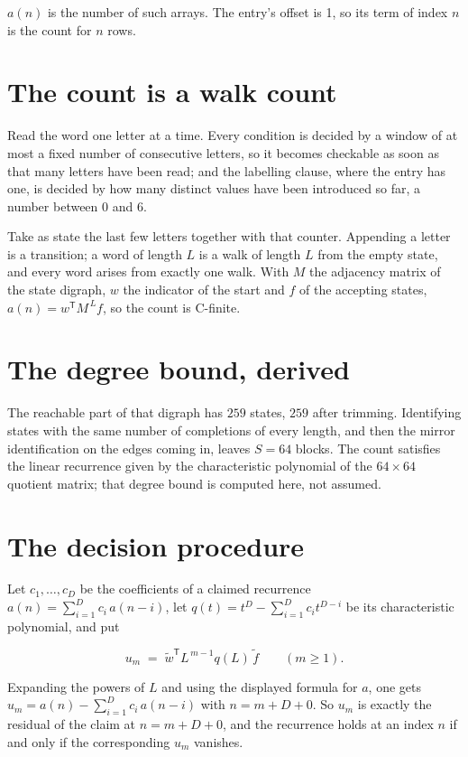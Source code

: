 \documentclass[11pt]{article}
\theoremstyle{definition}
\begin{document}
$a(n)$ is the number of such arrays. The entry's offset is 1, so its term of index $n$ is the count for $n$ rows.

\section{The count is a walk count}

Read the word one letter at a time. Every condition is decided by a window of at most a fixed number of consecutive letters, so it becomes checkable as soon as that many letters have been read; and the labelling clause, where the entry has one, is decided by how many distinct values have been introduced so far, a number between $0$ and 6.

Take as state the last few letters together with that counter. Appending a letter is a transition; a word of length $L$ is a walk of length $L$ from the empty state, and every word arises from exactly one walk. With $M$ the adjacency matrix of the state digraph, $w$ the indicator of the start and $f$ of the accepting states, $a(n) = w^{\mathsf T}M^{\,L}f$, so the count is C-finite.

\section{The degree bound, derived}

The reachable part of that digraph has $259$ states, $259$ after trimming. Identifying states with the same number of completions of every length, and then the mirror identification on the edges coming in, leaves $S = 64$ blocks. The count satisfies the linear recurrence given by the characteristic polynomial of the $64\times64$ quotient matrix; that degree bound is computed here, not assumed.

\section{The decision procedure}

Let $c_1,\dots,c_D$ be the coefficients of a claimed recurrence $a(n) = \sum_{i=1}^{D} c_i\,a(n-i)$, let $q(t) = t^{D} - \sum_{i=1}^{D} c_i t^{D-i}$ be its characteristic polynomial, and put

\[u_m \;=\; \tilde w^{\mathsf T} L^{\,m-1} q(L)\,\tilde f \qquad (m \ge 1).\]

Expanding the powers of $L$ and using the displayed formula for $a$, one gets $u_m = a(n) - \sum_{i=1}^{D} c_i\,a(n-i)$ with $n = m + D + 0$. So $u_m$ is exactly the residual of the claim at $n = m + D + 0$, and the recurrence holds at an index $n$ if and only if the corresponding $u_m$ vanishes.
\end{document}
